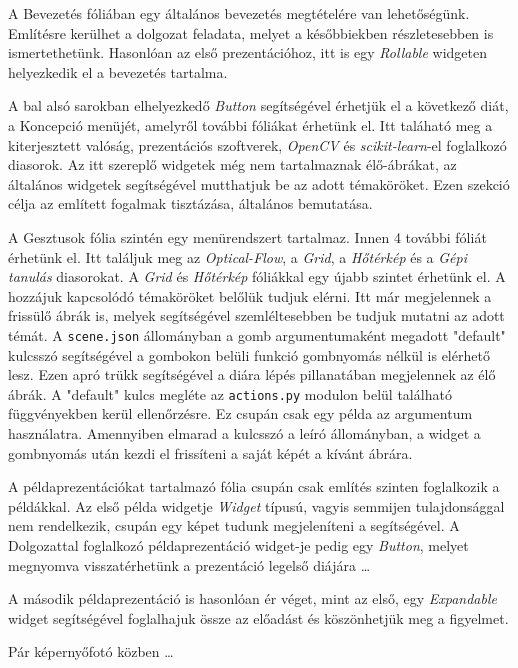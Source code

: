 A Bevezetés fóliában egy általános bevezetés megtételére van lehetőségünk. Említésre kerülhet a dolgozat feladata, melyet a későbbiekben részletesebben is ismertethetünk. Hasonlóan az első prezentációhoz, itt is egy \textit{Rollable} widgeten helyezkedik el a bevezetés tartalma.

A bal alsó sarokban elhelyezkedő \textit{Button} segítségével érhetjük el a következő diát, a Koncepció menüjét, amelyről további fóliákat érhetünk el. Itt taláható meg a kiterjesztett valóság, prezentációs szoftverek, \textit{OpenCV} és \textit{scikit-learn}-el foglalkozó diasorok. Az itt szereplő widgetek még nem tartalmaznak élő-ábrákat, az általános widgetek segítségével mutthatjuk be az adott témaköröket. Ezen szekció célja az említett fogalmak tisztázása, általános bemutatása.

A Gesztusok fólia szintén egy menürendszert tartalmaz. Innen 4 további fóliát érhetünk el.
Itt találjuk meg az \textit{Optical-Flow}, a \textit{Grid}, a \textit{Hőtérkép} és a \textit{Gépi tanulás} diasorokat. A \textit{Grid} és \textit{Hőtérkép} fóliákkal egy újabb szintet érhetünk el. A hozzájuk kapcsolódó témaköröket belőlük tudjuk elérni. Itt már megjelennek a frissülő ábrák is, melyek segítségével szemléltesebben be tudjuk mutatni az adott témát.
A \texttt{scene.json} állományban a gomb argumentumaként megadott "default" kulcsszó segítségével a gombokon belüli funkció gombnyomás nélkül is elérhető lesz. Ezen apró trükk segítségével a diára lépés pillanatában megjelennek az élő ábrák. A "default" kulcs megléte az \texttt{actions.py} modulon belül található függvényekben kerül ellenőrzésre. Ez csupán csak egy példa az argumentum használatra. Amennyiben elmarad a kulcsszó a leíró állományban, a widget a gombnyomás után kezdi el frissíteni a saját képét a kívánt ábrára.

A példaprezentációkat tartalmazó fólia csupán csak említés szinten foglalkozik a példákkal. Az első példa widgetje \textit{Widget} típusú, vagyis semmijen tulajdonsággal nem rendelkezik, csupán egy képet tudunk megjeleníteni a segítségével. A Dolgozattal foglalkozó példaprezentáció widget-je pedig egy \textit{Button}, melyet megnyomva visszatérhetünk a prezentáció legelső diájára \ldots

A második példaprezentáció is hasonlóan ér véget, mint az első, egy \textit{Expandable} widget segítségével foglalhajuk össze az előadást és köszönhetjük meg a figyelmet.

Pár képernyőfotó közben \ldots